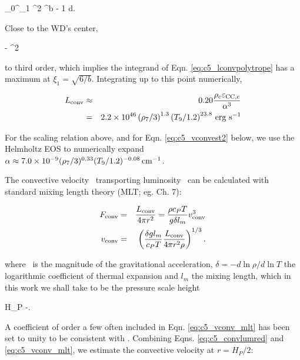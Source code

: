 \eqbegin
\Lconv {}\pi\rhoc\epscentral{}\int_0^{\xi_1} \xi^2 \theta^{b - 1} d\xi.
\label{eq:c5_lconvpolytrope}
\eqend

\noindent Close to the WD's center, 

\eqbegin
\theta {} - \xi^2
\label{eq:c5_theta_approx}
\eqend

\noindent to third order, which implies the integrand of Eqn. \ref{eq:c5_lconvpolytrope} has a maximum at $\xi_1 = \sqrt{6/b}$.  Integrating up to this point numerically,

\begin{eqnarray}
\Lconv &\approx& 0.20\frac{\rhoc\epscentral}{\alpha^3}  \nonumber \\
&=& 2.2\times10^{46}\left(\rho_7/3\right)^{1.3}\left(T_9/1.2\right)^{23.8}\,\mrm{erg}\,\,\mrm{s}^{-1}
\label{eq:c5_convlumred}
\end{eqnarray}

\noindent For the scaling relation above, and for Eqn. \ref{eq:c5_vconvest2} below, we use the Helmholtz EOS to numerically expand $\alpha \approx 7.0\times10^{-9}(\rho_7/3)^{0.33}(T_9/1.2)^{-0.08}\,\mathrm{cm}^{-1}$.


The convective velocity \vconv\ transporting luminosity \Lconv\ can be calculated with standard mixing length theory (MLT; eg. \citealt{kippww12} Ch. 7):

\begin{eqnarray}
\Fconv &=& \frac{\Lconv}{4\pi r^2} = \frac{\rho c_PT}{\gacc\delta l_m} \vconv^3 \nonumber \\
\vconv &=& \left(\frac{\delta \gacc l_m}{c_P T}\frac{\Lconv}{4\pi r^2 \rho}\right)^{1/3}.
\label{eq:c5_vconv_mlt}
\end{eqnarray}


\noindent where \gacc\ is the magnitude of the gravitational acceleration, $\delta = -d\ln\rho/d\ln T$ the logarithmic coefficient of thermal expansion and $l_m$ the mixing length, which in this work we shall take to be the pressure scale height

\eqbegin
H_P \equiv -.
\label{eq:c5_scaleheight}
\eqend

\noindent A coefficient of order a few often included in Eqn. \ref{eq:c5_vconv_mlt} has been set to unity to be consistent with \citeal{piroc08}.  Combining Eqns. \ref{eq:c5_convlumred} and \ref{eq:c5_vconv_mlt}, we estimate the convective velocity at $r = H_P/2$:

